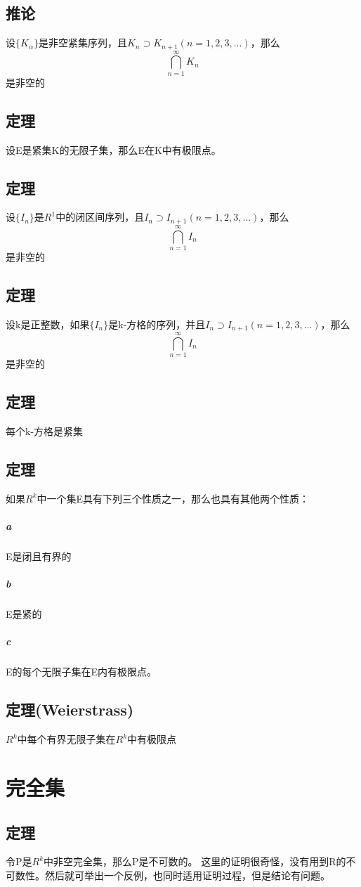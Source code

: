 \section*{推论} 设$\{ K_{\alpha} \}$是非空紧集序列，且$ K_n \supset K_{n+1} ( n = 1, 2, 3, ... ) $，那么$$ \bigcap_{n=1}^{\infty}K_n $$是非空的
\section{定理} 设E是紧集K的无限子集，那么E在K中有极限点。
\section{定理} 设$\{ I_n \}$是$R^1$中的闭区间序列，且$ I_n \supset I_{n+1} ( n = 1, 2, 3, ... ) $，那么$$ \bigcap_{n=1}^{\infty}I_n $$是非空的
\section{定理} 设k是正整数，如果$\{ I_n \}$是k-方格的序列，并且$ I_n \supset I_{n+1} ( n = 1, 2, 3, ... ) $，那么$$ \bigcap_{n=1}^{\infty}I_n $$是非空的
\section{定理}每个k-方格是紧集
\section{定理}如果$R^k$中一个集E具有下列三个性质之一，那么也具有其他两个性质：
\paragraph{a} E是闭且有界的
\paragraph{b} E是紧的
\paragraph{c} E的每个无限子集在E内有极限点。
\section{定理(Weierstrass)} $R^k$中每个有界无限子集在$R^k$中有极限点
\subparagraph*{}
\chapter*{完全集}
\section{定理} 令P是$R^k$中非空完全集，那么P是不可数的。
这里的证明很奇怪，没有用到R的不可数性。然后就可举出一个反例，也同时适用证明过程，但是结论有问题。
